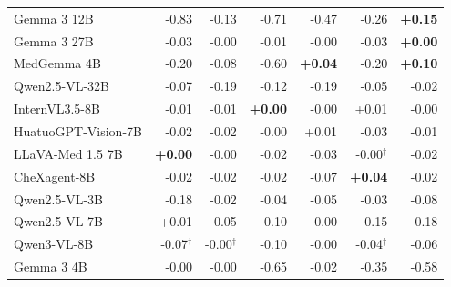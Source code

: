 \documentclass[11pt]{article}
\begin{document}
\begin{table}[t]
{\begin{tabular}{lrrrrrr}
Gemma 3 12B & \cellcolor{cfSlate4}-0.83 & \cellcolor{cfSlate3}-0.13 & \cellcolor{cfSlate4}-0.71 & \cellcolor{cfSlate4}-0.47 & \cellcolor{cfSlate4}-0.26 & \cellcolor{cfTerra3}\textbf{+0.15} \\
Gemma 3 27B & \cellcolor{cfSlate2}-0.03 & \cellcolor{cfSlate1}-0.00 & \cellcolor{cfSlate1}-0.01 & \cellcolor{cfSlate1}-0.00 & \cellcolor{cfSlate2}-0.03 & \cellcolor{cfTerra1}\textbf{+0.00} \\
MedGemma 4B & \cellcolor{cfSlate3}-0.20 & \cellcolor{cfSlate2}-0.08 & \cellcolor{cfSlate4}-0.60 & \cellcolor{cfTerra2}\textbf{+0.04} & \cellcolor{cfSlate3}-0.20 & \cellcolor{cfTerra3}\textbf{+0.10} \\
Qwen2.5-VL-32B & \cellcolor{cfSlate2}-0.07 & \cellcolor{cfSlate3}-0.19 & \cellcolor{cfSlate3}-0.12 & \cellcolor{cfSlate3}-0.19 & \cellcolor{cfSlate2}-0.05 & \cellcolor{cfSlate2}-0.02 \\
InternVL3.5-8B & \cellcolor{cfSlate1}-0.01 & \cellcolor{cfSlate1}-0.01 & \cellcolor{cfTerra1}\textbf{+0.00} & \cellcolor{cfSlate1}-0.00 & \cellcolor{cfTerra1}+0.01 & \cellcolor{cfSlate1}-0.00 \\
HuatuoGPT-Vision-7B & \cellcolor{cfSlate2}-0.02 & \cellcolor{cfSlate1}-0.02 & \cellcolor{cfSlate1}-0.00 & \cellcolor{cfTerra1}+0.01 & \cellcolor{cfSlate2}-0.03 & \cellcolor{cfSlate1}-0.01 \\
LLaVA-Med 1.5 7B & \cellcolor{cfTerra1}\textbf{+0.00} & \cellcolor{cfSlate1}-0.00 & \cellcolor{cfSlate2}-0.02 & \cellcolor{cfSlate2}-0.03 & \cellcolor{cfSlate1}-0.00$^{\dagger}$ & \cellcolor{cfSlate1}-0.02 \\
CheXagent-8B & \cellcolor{cfSlate2}-0.02 & \cellcolor{cfSlate1}-0.02 & \cellcolor{cfSlate2}-0.02 & \cellcolor{cfSlate2}-0.07 & \cellcolor{cfTerra2}\textbf{+0.04} & \cellcolor{cfSlate2}-0.02 \\
Qwen2.5-VL-3B & \cellcolor{cfSlate3}-0.18 & \cellcolor{cfSlate1}-0.02 & \cellcolor{cfSlate2}-0.04 & \cellcolor{cfSlate2}-0.05 & \cellcolor{cfSlate2}-0.03 & \cellcolor{cfSlate2}-0.08 \\
Qwen2.5-VL-7B & \cellcolor{cfTerra1}+0.01 & \cellcolor{cfSlate2}-0.05 & \cellcolor{cfSlate2}-0.10 & \cellcolor{cfSlate1}-0.00 & \cellcolor{cfSlate3}-0.15 & \cellcolor{cfSlate3}-0.18 \\
Qwen3-VL-8B & \cellcolor{cfSlate2}-0.07$^{\dagger}$ & \cellcolor{cfSlate1}-0.00$^{\dagger}$ & \cellcolor{cfSlate2}-0.10 & \cellcolor{cfSlate1}-0.00 & \cellcolor{cfSlate2}-0.04$^{\dagger}$ & \cellcolor{cfSlate2}-0.06 \\
Gemma 3 4B & \cellcolor{cfSlate1}-0.00 & \cellcolor{cfSlate1}-0.00 & \cellcolor{cfSlate4}-0.65 & \cellcolor{cfSlate1}-0.02 & \cellcolor{cfSlate4}-0.35 & \cellcolor{cfSlate4}-0.58 \\

\end{tabular}}
\end{table}
\end{document}
